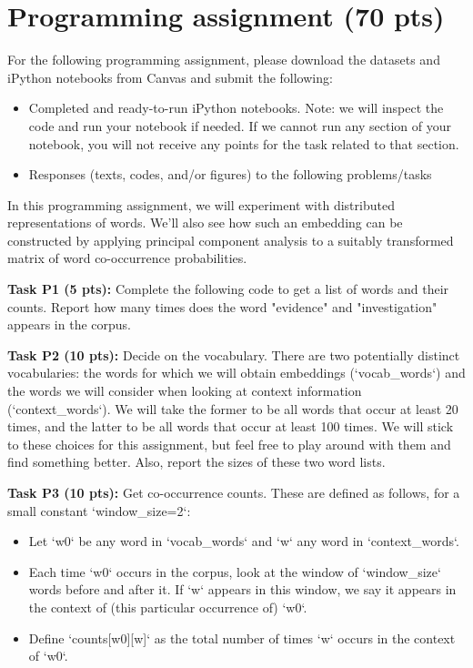 \documentclass[12pt]{article}
\newcommand{\prsol}[1]{\ifthenelse{\boolean{sol}}{{\color{blue}\textbf{Solution:} #1}}{} }
\begin{document}
\prsol{
}

\section{Programming assignment (70 pts)}

For the following programming assignment, please download the datasets and iPython notebooks from Canvas and submit the following:
\begin{itemize}
    \item Completed and ready-to-run iPython notebooks. Note: we will inspect the code and run your notebook if needed. If we cannot run any section of your notebook, you will not receive any points for the task related to that section. 
    \item Responses (texts, codes, and/or figures) to the following problems/tasks
\end{itemize}


In this programming assignment, we will experiment with distributed representations of words. We'll also see how such an embedding can be constructed by applying principal component analysis to a suitably transformed matrix of word co-occurrence probabilities.



\textbf{Task P1 (5 pts):} Complete the following code to get a list of words and their counts. Report how many times does the word "evidence" and "investigation" appears in the corpus.

\textbf{Task P2 (10 pts):} Decide on the vocabulary. There are two potentially distinct vocabularies: the words for which we will obtain embeddings (`vocab\_words`) and the words we will consider when looking at context information (`context\_words`). We will take the former to be all words that occur at least 20 times, and the latter to be all words that occur at least 100 times. We will stick to these choices for this assignment, but feel free to play around with them and find something better. Also, report the sizes of these two word lists.

\textbf{Task P3 (10 pts):} Get co-occurrence counts. These are defined as follows, for a small constant `window\_size=2`:
\begin{itemize}
    \item Let `w0` be any word in `vocab\_words` and `w` any word in `context\_words`.
    \item Each time `w0` occurs in the corpus, look at the window of `window\_size` words before and after it. If `w` appears in this window, we say it appears in the context of (this particular occurrence of) `w0`.
    \item Define `counts[w0][w]` as the total number of times `w` occurs in the context of `w0`.
\end{itemize}
\end{document}
